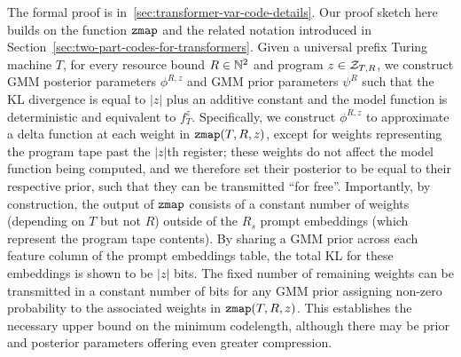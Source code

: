 The formal proof is in~\ref{sec:transformer-var-code-details}. Our proof sketch here builds on the function $\texttt{zmap}$ and the related notation introduced in Section~\ref{sec:two-part-codes-for-transformers}. Given a universal prefix Turing machine $T$, for every resource bound $R \in {\mathbb{N}^2}$ and program $z \in {\mathcal{Z}}_{T,R}$, we construct GMM posterior parameters $\phi^{R,z}$ and GMM prior parameters $\psi^{R}$ such that the KL divergence is equal to $|z|$ plus an additive constant and the model function is deterministic and equivalent to $f_T^z$. Specifically, we construct $\phi^{R,z}$ to approximate a delta function at each weight in $\texttt{zmap}(T,R,z)$, except for weights representing the program tape past the $|z|$th register; these weights do not affect the model function being computed, and we therefore set their posterior to be equal to their respective prior, such that they can be transmitted ``for free''.
Importantly, by construction, the output of $\texttt{zmap}$ consists of a constant number of weights (depending on $T$ but not $R$) outside of the $R_s$ prompt embeddings (which represent the program tape contents). By sharing a GMM prior across each feature column of the prompt embeddings table, the total KL for these embeddings is shown to be $|z|$ bits.
The fixed number of remaining weights can be transmitted in a constant number of bits for any GMM prior assigning non-zero probability to the associated weights in $\texttt{zmap}(T,R,z)$. This establishes the necessary upper bound on the minimum codelength, although there may be prior and posterior parameters offering even greater compression.


